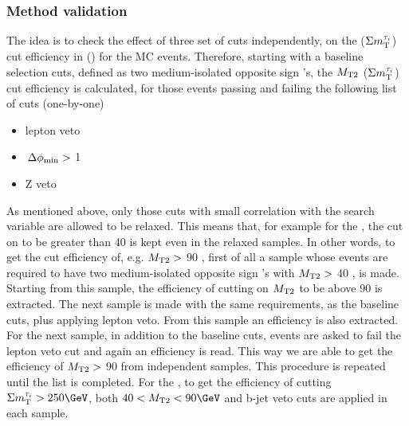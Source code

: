 \subsubsection{Method validation}
The idea is to check the effect of three set of cuts independently, 
on the \mttwo ($\Sigma m_{\rm T}^{\tau_i}$) cut efficiency in  \binone (\bintwo) for the \wjets MC events. 
Therefore, starting with a baseline selection cuts, defined as two 
medium-isolated opposite sign \Tau's, the ${M_{\rm T2}}$ ($\Sigma m_{\rm T}^{\tau_i}$) cut 
efficiency is calculated, for those events passing and failing the following list of cuts (one-by-one)
\begin{itemize}
\item lepton veto
\item $\,{\Delta\phi_{\rm min}}>$ 1
\item Z veto 
\end{itemize}
As mentioned above, only those cuts with small correlation with the search variable are allowed to be relaxed. This 
means that, for example for the \binone, the cut on \mttwo to be greater than 40 \GeV is kept even in the relaxed samples. 
In other words, to get the cut efficiency of, e.g. ${M_{\rm T2}}>$ 90 \GeV, first of all a sample whose events are required 
to have two medium-isolated opposite sign \Tau's with ${M_{\rm T2}}>$ 40 \GeV, is made. Starting from this sample, the efficiency of 
cutting on ${M_{\rm T2}}$ to be above 90 \GeV is extracted. The next sample is made with the same requirements, as the baseline cuts, 
plus applying lepton veto. From this sample an efficiency is also extracted. For the next sample, in addition to the baseline 
cuts, events are asked to fail the lepton veto cut and again an efficiency is read. This way we are able to get the efficiency 
of ${M_{\rm T2}}>$ 90 \GeV from independent samples. This procedure is repeated until the list is completed. For the \bintwo, 
 to get the efficiency of cutting $\SumMT>250\GeV$, both $40 < \mttwo < 90 \GeV$ and b-jet veto cuts are applied in each sample.
            
